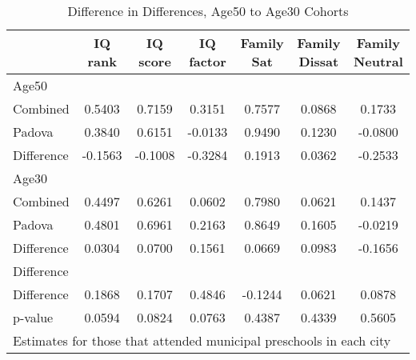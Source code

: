 \begin{table}[htbp]\centering
\caption{Difference in Differences, Age50 to Age30 Cohorts}
\begin{tabular}{l*{6}{c}}
\hline\hline
            &     IQ rank&    IQ score&   IQ factor&  Family Sat&Family Dissat&Family Neutral\\
\hline
Age50       &            &            &            &            &            &            \\
Combined    &      0.5403&      0.7159&      0.3151&      0.7577&      0.0868&      0.1733\\
Padova      &      0.3840&      0.6151&     -0.0133&      0.9490&      0.1230&     -0.0800\\
Difference  &     -0.1563&     -0.1008&     -0.3284&      0.1913&      0.0362&     -0.2533\\
\hline
Age30       &            &            &            &            &            &            \\
Combined    &      0.4497&      0.6261&      0.0602&      0.7980&      0.0621&      0.1437\\
Padova      &      0.4801&      0.6961&      0.2163&      0.8649&      0.1605&     -0.0219\\
Difference  &      0.0304&      0.0700&      0.1561&      0.0669&      0.0983&     -0.1656\\
\hline
Difference  &            &            &            &            &            &            \\
Difference  &      0.1868&      0.1707&      0.4846&     -0.1244&      0.0621&      0.0878\\
p-value     &      0.0594&      0.0824&      0.0763&      0.4387&      0.4339&      0.5605\\
\hline\hline
\multicolumn{7}{l}{\footnotesize Estimates for those that attended municipal preschools in each city}\\
\end{tabular}
\end{table}
